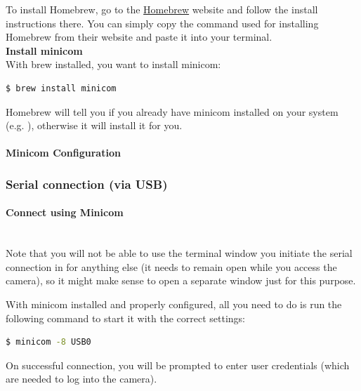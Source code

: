 To install Homebrew, go to the \href{https://brew.sh/}{Homebrew} website and follow the install instructions there. You can simply copy the command used for installing Homebrew from their website and paste it into your terminal.\\

\textbf{Install minicom}\\

With brew installed, you want to install minicom:

\begin{lstlisting}[language=bash,morekeywords=$,keywordstyle=\bfseries,frame=none,xleftmargin=.25in,belowskip=2em, aboveskip=2em]
$ brew install minicom
\end{lstlisting}

Homebrew will tell you if you already have minicom installed on your system (e.g. ), otherwise it will install it for you. 


\paragraph{Minicom Configuration}
\subsubsection{Serial connection (via USB)}
\paragraph{Connect using Minicom}\mbox{}\\
Note that you will not be able to use the terminal window you initiate the serial connection in for anything else (it needs to remain open while you access the camera), so it might make sense to open a separate window just for this purpose.

With minicom installed and properly configured, all you need to do is run the following command to start it with the correct settings:

\begin{lstlisting}[language=bash,morekeywords=$,keywordstyle=\bfseries,frame=none,xleftmargin=.25in,belowskip=2em, aboveskip=2em]
$ minicom -8 USB0
\end{lstlisting}

On successful connection, you will be prompted to enter user credentials (which are needed to log into the camera).\\

